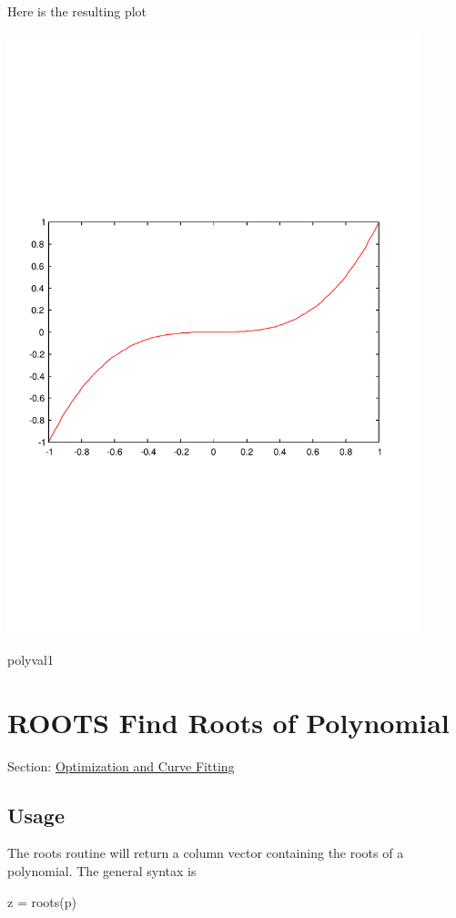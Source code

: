 Here is the resulting plot  
\begin{DoxyImage}
\includegraphics[width=12cm]{polyval1}
\caption{polyval1}
\end{DoxyImage}
 \hypertarget{curvefit_roots}{}\section{R\-O\-O\-T\-S Find Roots of Polynomial}\label{curvefit_roots}
Section\-: \hyperlink{sec_curvefit}{Optimization and Curve Fitting} \hypertarget{vtkwidgets_vtkxyplotwidget_Usage}{}\subsection{Usage}\label{vtkwidgets_vtkxyplotwidget_Usage}
The {\ttfamily roots} routine will return a column vector containing the roots of a polynomial. The general syntax is \begin{DoxyVerb}   z = roots(p)
\end{DoxyVerb}
